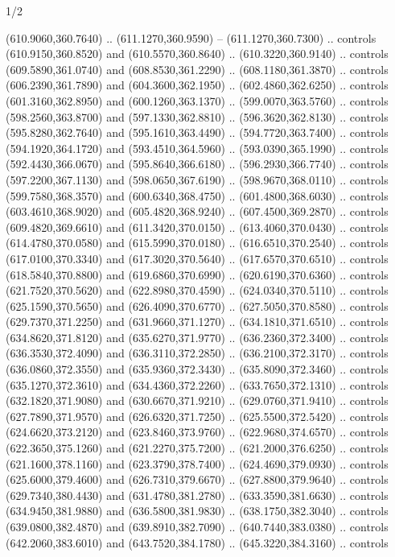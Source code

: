 \begin{flagdescription}{1/2}
\begin{scope}[xshift=0.5\flaglength,yshift=0.5\flagwidth,scale=\flagwidth/759]
\begin{scope}[y=0.8pt, x=0.8pt, yscale=-1,shift={(-720,-480)}]
\begin{scope}[cm={{1.14637,0.0,0.0,1.17117,(33.17849,82.1384)}}]
  (610.9060,360.7640) .. (611.1270,360.9590) -- (611.1270,360.7300) .. controls
  (610.9150,360.8520) and (610.5570,360.8640) .. (610.3220,360.9140) .. controls
  (609.5890,361.0740) and (608.8530,361.2290) .. (608.1180,361.3870) .. controls
  (606.2390,361.7890) and (604.3600,362.1950) .. (602.4860,362.6250) .. controls
  (601.3160,362.8950) and (600.1260,363.1370) .. (599.0070,363.5760) .. controls
  (598.2560,363.8700) and (597.1330,362.8810) .. (596.3620,362.8130) .. controls
  (595.8280,362.7640) and (595.1610,363.4490) .. (594.7720,363.7400) .. controls
  (594.1920,364.1720) and (593.4510,364.5960) .. (593.0390,365.1990) .. controls
  (592.4430,366.0670) and (595.8640,366.6180) .. (596.2930,366.7740) .. controls
  (597.2200,367.1130) and (598.0650,367.6190) .. (598.9670,368.0110) .. controls
  (599.7580,368.3570) and (600.6340,368.4750) .. (601.4800,368.6030) .. controls
  (603.4610,368.9020) and (605.4820,368.9240) .. (607.4500,369.2870) .. controls
  (609.4820,369.6610) and (611.3420,370.0150) .. (613.4060,370.0430) .. controls
  (614.4780,370.0580) and (615.5990,370.0180) .. (616.6510,370.2540) .. controls
  (617.0100,370.3340) and (617.3020,370.5640) .. (617.6570,370.6510) .. controls
  (618.5840,370.8800) and (619.6860,370.6990) .. (620.6190,370.6360) .. controls
  (621.7520,370.5620) and (622.8980,370.4590) .. (624.0340,370.5110) .. controls
  (625.1590,370.5650) and (626.4090,370.6770) .. (627.5050,370.8580) .. controls
  (629.7370,371.2250) and (631.9660,371.1270) .. (634.1810,371.6510) .. controls
  (634.8620,371.8120) and (635.6270,371.9770) .. (636.2360,372.3400) .. controls
  (636.3530,372.4090) and (636.3110,372.2850) .. (636.2100,372.3170) .. controls
  (636.0860,372.3550) and (635.9360,372.3430) .. (635.8090,372.3460) .. controls
  (635.1270,372.3610) and (634.4360,372.2260) .. (633.7650,372.1310) .. controls
  (632.1820,371.9080) and (630.6670,371.9210) .. (629.0760,371.9410) .. controls
  (627.7890,371.9570) and (626.6320,371.7250) .. (625.5500,372.5420) .. controls
  (624.6620,373.2120) and (623.8460,373.9760) .. (622.9680,374.6570) .. controls
  (622.3650,375.1260) and (621.2270,375.7200) .. (621.2000,376.6250) .. controls
  (621.1600,378.1160) and (623.3790,378.7400) .. (624.4690,379.0930) .. controls
  (625.6000,379.4600) and (626.7310,379.6670) .. (627.8800,379.9640) .. controls
  (629.7340,380.4430) and (631.4780,381.2780) .. (633.3590,381.6630) .. controls
  (634.9450,381.9880) and (636.5800,381.9830) .. (638.1750,382.3040) .. controls
  (639.0800,382.4870) and (639.8910,382.7090) .. (640.7440,383.0380) .. controls
  (642.2060,383.6010) and (643.7520,384.1780) .. (645.3220,384.3160) .. controls

\end{scope}
\end{scope}
\end{scope}
\end{flagdescription}
